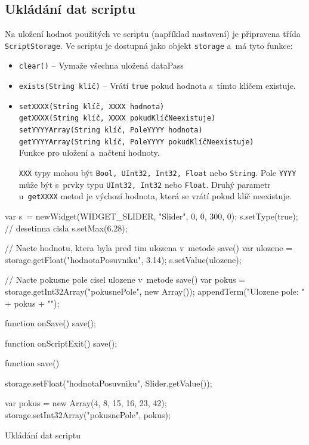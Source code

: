 \documentclass[12pt, a4paper, oneside]{article}
\begin{document}
\newpage
\subsection*{Ukládání dat scriptu}
Na uložení hodnot použitých ve scriptu (například nastavení) je připravena třída \verb|ScriptStorage|. Ve scriptu je dostupná jako objekt \verb|storage| a~má tyto funkce:
\begin{itemize}
    \item {\color{blue}\verb/clear()/} -- Vymaže všechna uložená dataPass
    \item {\color{blue}\verb/exists(String klíč)/} -- Vrátí \verb|true| pokud hodnota s~tímto klíčem existuje.
    \item {\color{blue}\verb/setXXXX(String klíč, XXXX hodnota)/} \\
        {\color{blue}\verb/getXXXX(String klíč, XXXX pokudKlíčNeexistuje)/} \\
        {\color{blue}\verb/setYYYYArray(String klíč, PoleYYYY hodnota)/} \\
        {\color{blue}\verb/getYYYYArray(String klíč, PoleYYYY pokudKlíčNeexistuje)/} \\
            Funkce pro uložení a~načtení hodnoty.

        \verb|XXX| typy mohou být \verb|Bool, UInt32, Int32, Float| nebo \verb|String|. Pole \verb|YYYY| může být s~prvky typu \verb|UInt32, Int32| nebo \verb|Float|. Druhý parametr u~\verb|getXXXX| metod je výchozí hodnota, která se vrátí pokud klíč neexistuje.
\end{itemize}

\begin{listing}[H]
\begin{jscode}
var s~= newWidget(WIDGET_SLIDER, "Slider", 0, 0, 300, 0);
s.setType(true); // desetinna cisla
s.setMax(6.28);

// Nacte hodnotu, ktera byla pred tim ulozena v~metode save()
var ulozene = storage.getFloat("hodnotaPosuvniku", 3.14);
s.setValue(ulozene);

// Nacte pokusne pole cisel ulozene v~metode save()
var pokus = storage.getInt32Array("pokusnePole", new Array());
appendTerm("Ulozene pole: " + pokus + "\n");

function onSave() {
    save();
}

function onScriptExit() {
    save();
}

function save() {
    storage.setFloat("hodnotaPosuvniku", Slider.getValue());

    var pokus = new Array(4, 8, 15, 16, 23, 42);
    storage.setInt32Array("pokusnePole", pokus);
}
\end{jscode}
\caption{Ukládání dat scriptu}
\end{listing}
\end{document}
